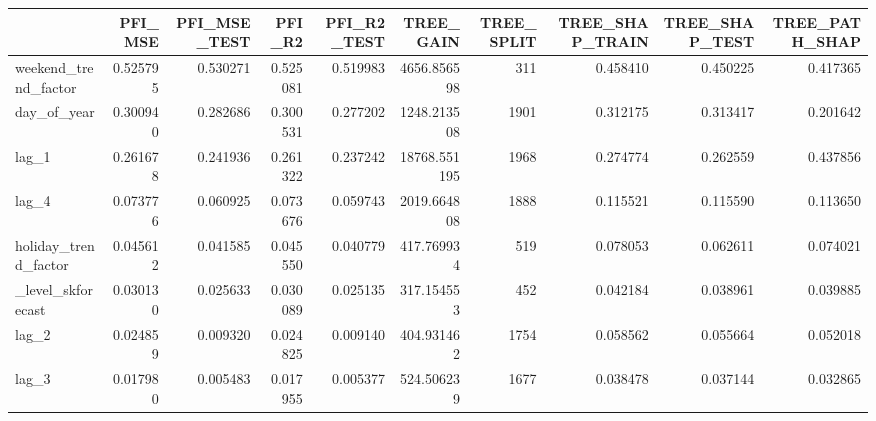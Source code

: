 \begin{tabular}{lrrrrrrrrr}
\toprule
 & PFI_MSE & PFI_MSE_TEST & PFI_R2 & PFI_R2_TEST & TREE_GAIN & TREE_SPLIT & TREE_SHAP_TRAIN & TREE_SHAP_TEST & TREE_PATH_SHAP \\
\midrule
weekend_trend_factor & 0.525795 & 0.530271 & 0.525081 & 0.519983 & 4656.856598 & 311 & 0.458410 & 0.450225 & 0.417365 \\
day_of_year & 0.300940 & 0.282686 & 0.300531 & 0.277202 & 1248.213508 & 1901 & 0.312175 & 0.313417 & 0.201642 \\
lag_1 & 0.261678 & 0.241936 & 0.261322 & 0.237242 & 18768.551195 & 1968 & 0.274774 & 0.262559 & 0.437856 \\
lag_4 & 0.073776 & 0.060925 & 0.073676 & 0.059743 & 2019.664808 & 1888 & 0.115521 & 0.115590 & 0.113650 \\
holiday_trend_factor & 0.045612 & 0.041585 & 0.045550 & 0.040779 & 417.769934 & 519 & 0.078053 & 0.062611 & 0.074021 \\
_level_skforecast & 0.030130 & 0.025633 & 0.030089 & 0.025135 & 317.154553 & 452 & 0.042184 & 0.038961 & 0.039885 \\
lag_2 & 0.024859 & 0.009320 & 0.024825 & 0.009140 & 404.931462 & 1754 & 0.058562 & 0.055664 & 0.052018 \\
lag_3 & 0.017980 & 0.005483 & 0.017955 & 0.005377 & 524.506239 & 1677 & 0.038478 & 0.037144 & 0.032865 \\
\bottomrule
\end{tabular}
